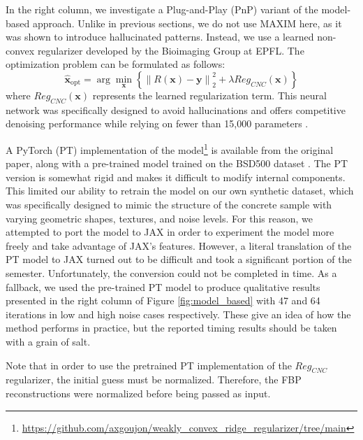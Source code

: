 \documentclass{article}
\begin{document}
In the right column, we investigate a Plug-and-Play (PnP) variant of the model-based approach. Unlike in previous sections, we do not use MAXIM here, as it was shown to introduce hallucinated patterns. Instead, we use a learned non-convex regularizer developed by the Bioimaging Group at EPFL. The optimization problem can be formulated as follows:
\begin{equation}
\hat{\mathbf{x}}_{\mathrm{opt}} = \arg\min_{\mathbf{x}} \left\{ \left\| R(\mathbf{x}) - \mathbf{y} \right\|_2^2 + \lambda Reg_{CNC}(\mathbf{x}) \right\}
\label{eq:CNC_fini}
\end{equation}
where $Reg_{CNC}(\mathbf{x})$ represents the learned regularization term. This neural network was specifically designed to avoid hallucinations and offers competitive denoising performance while relying on fewer than 15,000 parameters \cite{goujon_learning_2024}.

A PyTorch (PT) implementation of the model\footnote{\url{https://github.com/axgoujon/weakly_convex_ridge_regularizer/tree/main}} is available from the original paper, along with a pre-trained model trained on the BSD500 dataset \cite{arbelaez_contour_2011}. The PT version is somewhat rigid and makes it difficult to modify internal components. This limited our ability to retrain the model on our own synthetic dataset, which was specifically designed to mimic the structure of the concrete sample with varying geometric shapes, textures, and noise levels. For this reason, we attempted to port the model to JAX in order to experiment the model more freely and take advantage of JAX’s features. However, a literal translation of the PT model to JAX turned out to be difficult and took a significant portion of the semester. Unfortunately, the conversion could not be completed in time. As a fallback, we used the pre-trained PT model to produce qualitative results presented in the right column of Figure \ref{fig:model_based} with 47 and 64 iterations in low and high noise cases respectively. These give an idea of how the method performs in practice, but the reported timing results should be taken with a grain of salt.
\medskip

Note that in order to use the pretrained PT implementation of the $Reg_{CNC}$ regularizer, the initial guess must be normalized. Therefore, the FBP reconstructions were normalized before being passed as input.
\smallskip
\end{document}
